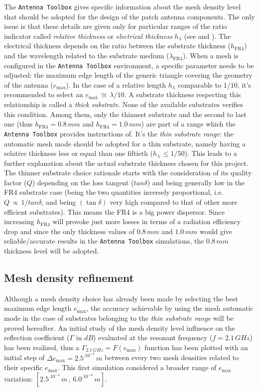\documentclass[10 pt,a4paper,twocolumn]{article}
\begin{document}
{The \texttt{Antenna Toolbox} gives specific
information about the mesh density level that should be adopted for the design of the patch antenna components. The only issue is that these details are given only for particular ranges of the ratio indicator called \emph{relative thickness} or \emph{electrical thickness} $h_{\lambda}$ (see \textbf{\cite{makarov}} and \textbf{\cite{meshing}}). The electrical thickness depends on the ratio between the substrate thickness ($h_{\operatorname{FR4}}$) and the wavelength related to the substrate medium ($\lambda_{\operatorname{FR4}}$). When a mesh is configured in the \texttt{Antenna Toolbox} environment, a specific parameter needs to be adjusted: the maximum edge length of the generic triangle covering the geometry of the antenna ($e_{\max}$). In the case of a relative length $h_\lambda$ comparable to $1/10$, it's recommended to select an $e_{\max}\,\cong\,\lambda/10$. A substrate thickness respecting this relationship is called a \emph{thick substrate}. None of the available substrates verifies this condition. Among them, only the thinnest substrate and the second to last one (thus $h_{\operatorname{FR4}}=0.8\,mm$ and $h_{\operatorname{FR4}}=1.0\,mm$) are part of a range which the \texttt{Antenna Toolbox} provides instructions of. It's the \emph{thin substrate range}: the automatic mesh mode should be adopted for a thin substrate, namely having a relative thickness less or equal than one fiftieth ($h_\lambda\,\leq{1/50}$). This leads to a further explanation about the actual substrate thickness chosen for this project. The thinner substrate choice rationale starts with the consideration of its quality factor ($Q$) depending on the loss tangent ($tan\delta$) and being generally low in the FR4 substrate case (being the two quantities inversely proportional, i.e. $Q\,\propto\,1/tan\delta$, and being $(\tan\delta)$ very high compared to that of other more efficient substrates). This means the FR4 is a big power dispersor. Since increasing $h_{\operatorname{FR4}}$ will provoke just more losses in terms of a radiation efficiency drop and since the only thickness values of $0.8\,mm$ and $1.0\,mm$ would give reliable/accurate results in the \texttt{Antenna Toolbox} simulations, the $0.8\,mm$ thickness level will be adopted. 
\subsection*{Mesh density refinement}
Although a mesh density choice has already been made by selecting the best maximum edge length $e_{\max}$, the accuracy achievable by using the mesh automatic mode in the case of substrates belonging to the  \emph{thin substrate range} will be proved hereafter. An initial study of the mesh density level influence on the reflection coefficient ($\Gamma$ in $dB$) evaluated at the resonant frequency ($f=2.1\,GHz$) has been realized, thus a  $\Gamma_{2.1\,GHz}=F(e_{\max})$ function has been plotted with an initial step of $\Delta e_{\max} = 2.5^.10^{-4}\,m$ between every two mesh densities related to their specific $e_{\max}$. This first simulation considered a broader range of $e_{\max}$ variation: $[2.5^.10^{-4}\,m\,,\,6.0^.10^{-4}\,m]$. 
\indent 

}
\end{document}
